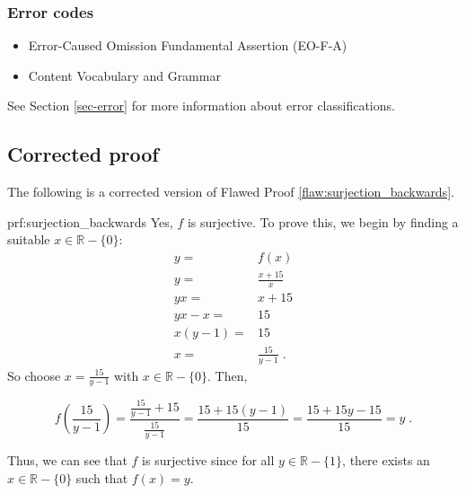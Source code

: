  
\subsubsection{Error codes}
\begin{itemize}
	\item 	Error-Caused Omission Fundamental Assertion (EO-F-A)
	\item   Content Vocabulary and Grammar
\end{itemize}
See Section \ref{sec-error} for more information about error classifications.

\clearpage
\subsection{Corrected proof}

The following is a corrected version of Flawed Proof \ref{flaw:surjection_backwards}. %

\begin{prf}{prf:surjection_backwards} %
Yes, $f$ is surjective. To prove this, we begin by finding a suitable $x \in \mathbb{R}-\{0\}$:
\begin{align*}
    y =& f(x) \\
    y =& \frac{x+15}{x} \\
    yx =& x+15 \\
    yx - x =& 15 \\
    x(y-1) =& 15 \\
    x =& \frac{15}{y-1}\;.
\end{align*}
So choose $x= \frac{15}{y-1}$ with $x \in \mathbb{R}-\{0\}$. Then,

$$f \left (\frac{15}{y-1} \right ) = \frac{\frac{15}{y-1} + 15}{\frac{15}{y-1}} = \frac{15 + 15(y-1)}{15} = \frac{15+15y-15}{15} = y\;. $$

Thus, we can see that $f$ is surjective since for all $y \in \mathbb{R}-\{1\}$, there exists an $x \in \mathbb{R}-\{0\}$ such that $f(x)=y.$  
\end{prf}